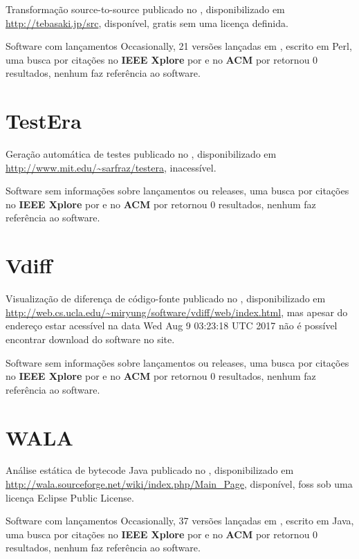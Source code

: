 Transformação source-to-source
publicado no  ,
disponibilizado em \url{http://tebasaki.jp/src},
disponível,
gratis
sem uma licença definida.

Software com lançamentos Occasionally,
21 versões lançadas
em ,
escrito em Perl,
uma busca por citações no {\bf IEEE Xplore} por
\texttt{}
e no {\bf ACM} por
\texttt{}
retornou
0 resultados,
nenhum faz referência ao software.



\section{TestEra}

Geração automática de testes
publicado no  ,
disponibilizado em \url{http://www.mit.edu/~sarfraz/testera},
inacessível.

Software sem informações sobre lançamentos ou releases,
uma busca por citações no {\bf IEEE Xplore} por
\texttt{}
e no {\bf ACM} por
\texttt{}
retornou
0 resultados,
nenhum faz referência ao software.



\section{Vdiff}

Visualização de diferença de código-fonte
publicado no  ,
disponibilizado em \url{http://web.cs.ucla.edu/~miryung/software/vdiff/web/index.html},
mas apesar do endereço estar acessível na data 
Wed Aug  9 03:23:18 UTC 2017
não é possível encontrar download do software no site.

Software sem informações sobre lançamentos ou releases,
uma busca por citações no {\bf IEEE Xplore} por
\texttt{}
e no {\bf ACM} por
\texttt{}
retornou
0 resultados,
nenhum faz referência ao software.



\section{WALA}

Análise estática de bytecode Java
publicado no  ,
disponibilizado em \url{http://wala.sourceforge.net/wiki/index.php/Main_Page},
disponível,
foss
sob uma licença Eclipse Public License.

Software com lançamentos Occasionally,
37 versões lançadas
em ,
escrito em Java,
uma busca por citações no {\bf IEEE Xplore} por
\texttt{}
e no {\bf ACM} por
\texttt{}
retornou
0 resultados,
nenhum faz referência ao software.



